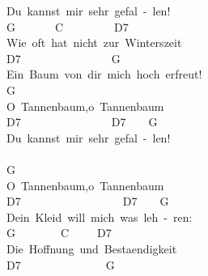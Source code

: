 \documentclass[]{book}
\begin{document}
Du~kannst~mir~sehr~gefal~-~len!\\
\hspace*{0.333em}\hspace*{0.333em}\hspace*{0.333em}\hspace*{0.333em}G~~~~~~~C~~~~~~~~~D7~~~~~~~~\\
Wie~oft~hat~nicht~zur~Winterszeit\\
\hspace*{0.333em}\hspace*{0.333em}\hspace*{0.333em}\hspace*{0.333em}D7~~~~~~~~~~~~~~~~G~~~~~~\\
Ein~Baum~von~dir~mich~hoch~erfreut!\\
\hspace*{0.333em}\hspace*{0.333em}G~~~\\
O~Tannenbaum,o~Tannenbaum\\
\hspace*{0.333em}\hspace*{0.333em}\hspace*{0.333em}D7~~~~~~~~~~~~~~~~D7~~~~G~~~~~~\\
Du~kannst~mir~sehr~gefal~-~len!\\
~\\
\hspace*{0.333em}\hspace*{0.333em}G~~~~~\\
O~Tannenbaum,o~Tannenbaum\\
\hspace*{0.333em}\hspace*{0.333em}\hspace*{0.333em}\hspace*{0.333em}\hspace*{0.333em}D7~~~~~~~~~~~~~~~~~~D7~~~~G~~~~~~\\
Dein~Kleid~will~mich~was~leh~-~ren:\\
\hspace*{0.333em}\hspace*{0.333em}\hspace*{0.333em}\hspace*{0.333em}G~~~~~~~~C~~~~~D7~~~\\
Die~Hoffnung~und~Bestaendigkeit\\
\hspace*{0.333em}\hspace*{0.333em}\hspace*{0.333em}\hspace*{0.333em}\hspace*{0.333em}D7~~~~~~~~~~~~~~~G~~~\\
\end{document}
